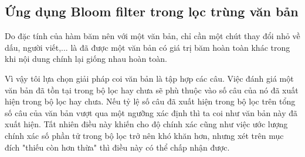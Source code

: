 \subsection{Ứng dụng Bloom filter trong lọc trùng văn bản}

Do đặc tính của hàm băm nên với một văn bản, chỉ cần một chút thay đổi nhỏ về dấu, người viết,... là đã được một văn bản có giá trị băm hoàn toàn khác trong khi nội dung chính lại giống nhau hoàn toàn. 

Vì vậy tôi lựa chọn giải pháp coi văn bản là tập hợp các câu. Việc đánh giá một văn bản đã tồn tại trong bộ lọc hay chưa sẽ phù thuộc vào số câu của nó đã xuất hiện trong bộ lọc hay chưa. Nếu tỷ lệ số câu đã xuất hiện trong bộ lọc trên tổng số câu của văn bản vượt qua một ngưỡng xác định thì ta coi như văn bản này đã xuất hiện. Tất nhiên điều này khiến cho độ chính xác cũng như việc ước lượng chính xác số phần tử trong bộ lọc trở nên khó khăn hơn, nhưng xét trên mục đích "thiếu còn hơn thừa" thì điều này có thể chấp nhận được.